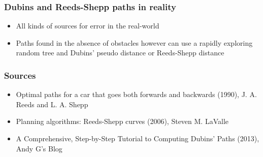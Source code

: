 \documentclass{beamer}
\begin{document}
\begin{frame}

\frametitle{Dubins and Reeds-Shepp paths in reality}

\begin{itemize}
	\item All kinds of sources for error in the real-world
	\pause
	\item Paths found in the absence of obstacles however can use a rapidly exploring random tree and Dubins' pseudo distance or Reeds-Shepp distance
\end{itemize}

\end{frame}

\begin{frame}

\frametitle{Sources}

	\begin{itemize}
		\item Optimal paths for a car that goes both forwards and backwards (1990), J. A. Reeds and L. A. Shepp
		\item Planning algorithms: Reeds-Shepp curves (2006), Steven M. LaValle
		\item A Comprehensive, Step-by-Step Tutorial to Computing Dubins' Paths (2013), Andy G's Blog
	\end{itemize}
\end{frame}
\end{document}
